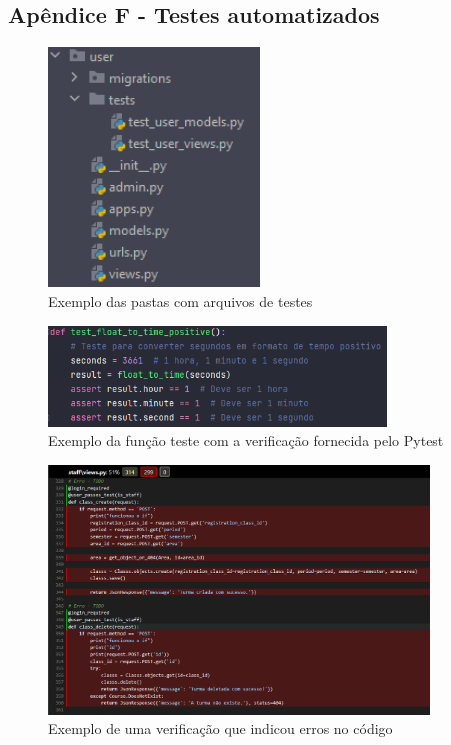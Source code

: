 \documentclass[12pt]{article}
\begin{document}
\subsection{Apêndice F - Testes automatizados}
\begin{figure}[h]
    \centering
    \includegraphics[width=0.5\textwidth]{arquivostestes.png}
    \caption{Exemplo das pastas com arquivos de testes}
    \label{fig:arquivostestes}
\end{figure}
\begin{figure}[h]
    \centering
    \includegraphics[width=0.8\textwidth]{funcaoteste.png}
    \caption{Exemplo da função teste com a verificação fornecida pelo Pytest}
    \label{fig:funcaoteste}
\end{figure}
\begin{figure}[h]
    \centering
    \includegraphics[width=0.9\textwidth]{testeerrado.png}
    \caption{Exemplo de uma verificação que indicou erros no código}
    \label{fig:testeerrado}
\end{figure}
\end{document}
